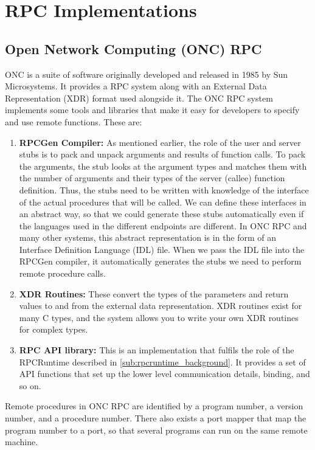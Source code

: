 \section{RPC Implementations} %
\label{sec:rpc_implementations}

\subsection{Open Network Computing (ONC) RPC} %
\label{sub:oncrpc_intro}

ONC is a suite of software originally developed and released in 1985 by Sun Microsystems\cite{stevens2004unix}. It provides a RPC system along with an External Data Representation (XDR) format used alongside it. The ONC RPC system implements some tools and libraries that make it easy for developers to specify and use remote functions. These are:

\begin{enumerate}
	\item \textbf{RPCGen Compiler:} As mentioned earlier, the role of the user and server stubs is to pack and unpack arguments and results of function calls. To pack the arguments, the stub looks at the argument types and matches them with the number of arguments and their types of the server (callee) function definition. Thus, the stubs need to be written with knowledge of the interface of the actual procedures that will be called. We can define these interfaces in an abstract way, so that we could generate these stubs automatically even if the languages used in the different endpoints are different. In ONC RPC and many other systems, this abstract representation is in the form of an Interface Definition Language (IDL) file. When we pass the IDL file into the RPCGen compiler, it automatically generates the stubs we need to perform remote procedure calls.
	\item \textbf{XDR Routines:} These convert the types of the parameters and return values to and from the external data representation. XDR routines exist for many C types, and the system allows you to write your own XDR routines for complex types.
	\item \textbf{RPC API library:} This is an implementation that fulfils the role of the RPCRuntime described in \ref{sub:rpcruntime_background}. It provides a set of API functions that set up the lower level communication details, binding, and so on.
\end{enumerate}

Remote procedures in ONC RPC are identified by a program number, a version number, and a procedure number. There also exists a port mapper that map the program number to a port, so that several programs can run on the same remote machine. 

